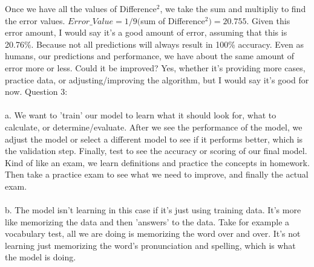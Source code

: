 \documentclass[12pt]{article}
\begin{document}
\indent Once we have all the values of Difference$^2$, we take the sum and multipliy to find the error values. 
$Error\_Value=1/9($sum of Difference$^2) = 20.755$. Given this error amount, I would say it's a good amount of error, assuming that
this is 20.76\%. Because not all predictions will always result in 100\% accuracy. Even as humans, our predictions and performance, we have about the same amount of error more or less. 
Could it be improved? Yes, whether it's providing more cases, practice data, or adjusting/improving the algorithm, but I would say it's good for now.
\newpage
\vspace*{-1cm}
\noindent Question 3:
\\\\\indent a. We want to 'train' our model to learn what it should look for, what to calculate, or determine/evaluate. 
After we see the performance of the model, we adjust the model or select a different model to see if it performs better, which is the validation step. 
Finally, test to see the accuracy or scoring of our final model.
 Kind of like an exam, we learn definitions and practice the concepts in homework. 
Then take a practice exam to see what we need to improve, and finally the actual exam. 
\\\\\indent b. The model isn't learning in this case if it's just using training data. It's more like memorizing the data and then 'answers' to the data. 
Take for example a vocabulary test, all we are doing is memorizing the word over and over. 
It's not learning just memorizing the word's pronunciation and spelling, which is what the model is doing.
\end{document}
